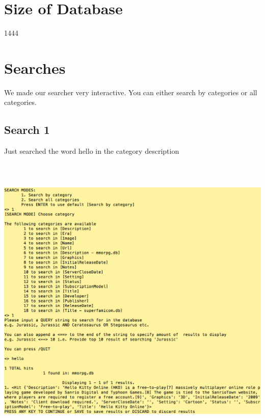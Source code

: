\documentclass[]{article}
\begin{document}
\section{Size of Database}
1444 

\section{Searches}
We made our searcher very interactive. You can either search by categories or all categories.

\subsection{Search 1}
Just searched the word hello in the category description\\
\includegraphics[width=15cm, height=15cm]{search1.png}
\end{document}
